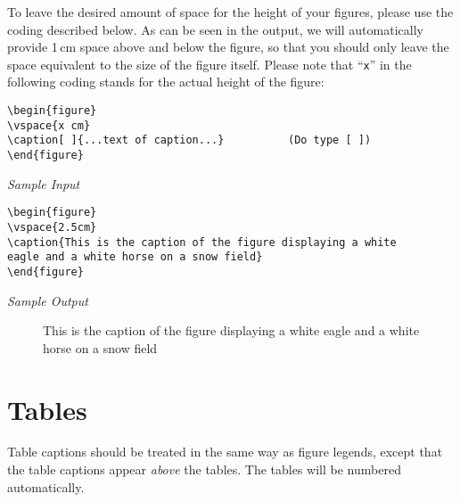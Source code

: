 To leave the desired amount of space for the height of
your figures, please use the coding described below.
As can be seen in the output, we will automatically
provide 1\,cm space above and below the figure,
so that you should only leave the space equivalent to the size of the
figure itself. Please note that ``\verb|x|'' in the following
coding stands for the actual height of the figure:
\begin{verbatim}
\begin{figure}
\vspace{x cm}
\caption[ ]{...text of caption...}          (Do type [ ])
\end{figure}
\end{verbatim}
\begin{flushleft}
{\it Sample Input}
\end{flushleft}
\begin{verbatim}
\begin{figure}
\vspace{2.5cm}
\caption{This is the caption of the figure displaying a white
eagle and a white horse on a snow field}
\end{figure}
\end{verbatim}
\begin{flushleft}
{\it Sample Output}
\end{flushleft}
\begin{figure}
\vspace{2.5cm}
\caption{This is the caption of the figure displaying a white eagle and
a white horse on a snow field}
\end{figure}
%
\section{Tables}
%
Table captions should be treated
in the same way as figure legends, except that
the table captions appear {\it above} the tables. The  tables
will be numbered automatically.
%
